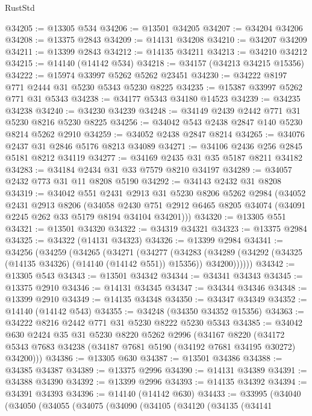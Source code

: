\begin{lexlean}{RustStd}
\begin{coremodule}
@34205 := @13305 @534
@34206 := @13501 @34205
@34207 := @34204 @34206
@34208 := @13375 @2843
@34209 := @14131 @34208
@34210 := @34207 @34209
@34211 := @13399 @2843
@34212 := @14135 @34211
@34213 := @34210 @34212
@34215 := @14140 (@14142 @534)
@34218 := @34157 (@34213 @34215 @15356)
@34222 := @15974 @33997 @5262 @5262 @23451
@34230 := @34222 @8197 @771 @2444 @31 @5230 @5343 @5230 @8225
@34235 := @15387 @33997 @5262 @771 @31 @5343
@34238 := @34177 @5343 @34180 @14523
@34239 := @34235 @34238
@34240 := @34230 @34239
@34248 := @34149 @2439 @2442 @771 @31 @5230 @8216 @5230 @8225
@34256 := @34042 @543 @2438 @2847 @140 @5230 @8214 @5262 @2910
@34259 := @34052 @2438 @2847 @8214
@34265 := @34076 @2437 @31 @2846 @5176 @8213 @34089
@34271 := @34106 @2436 @256 @2845 @5181 @8212 @34119
@34277 := @34169 @2435 @31 @35 @5187 @8211 @34182
@34283 := @34184 @2434 @31 @33 @7579 @8210 @34197
@34289 := @34057 @2432 @773 @31 @11 @8208 @5190
@34292 := @34143 @2432 @31 @8208
@34319 := @34042
    @551
    @2431
    @2913
    @31
    @5230
    @8206
    @5262
    @2984
    (@34052
      @2431
      @2913
      @8206
      (@34058
        @2430
        @751
        @2912
        @6465
        @8205
        @34074
        (@34091 @2245 @262 @33 @5179 @8194 @34104 @34201)))
@34320 := @13305 @551
@34321 := @13501 @34320
@34322 := @34319 @34321
@34323 := @13375 @2984
@34325 := @34322 (@14131 @34323)
@34326 := @13399 @2984
@34341 := @34256
    (@34259
      (@34265
        (@34271
          (@34277
            (@34283
              (@34289 (@34292 (@34325 (@14135 @34326) (@14140 (@14142 @551)) @15356)) @34200))))))
@34342 := @13305 @543
@34343 := @13501 @34342
@34344 := @34341 @34343
@34345 := @13375 @2910
@34346 := @14131 @34345
@34347 := @34344 @34346
@34348 := @13399 @2910
@34349 := @14135 @34348
@34350 := @34347 @34349
@34352 := @14140 (@14142 @543)
@34355 := @34248 (@34350 @34352 @15356)
@34363 := @34222 @8216 @2442 @771 @31 @5230 @8222 @5230 @5343
@34385 := @34042
    @630
    @2424
    @35
    @31
    @5230
    @8220
    @5262
    @2996
    (@34167
      @8220
      (@34172 @5343 @7683 @34238 (@34187 @7681 @5190 (@34192 @7681 @34195 @30272) @34200)))
@34386 := @13305 @630
@34387 := @13501 @34386
@34388 := @34385 @34387
@34389 := @13375 @2996
@34390 := @14131 @34389
@34391 := @34388 @34390
@34392 := @13399 @2996
@34393 := @14135 @34392
@34394 := @34391 @34393
@34396 := @14140 (@14142 @630)
@34433 := @33995
    (@34040
      (@34050
        (@34055
          (@34075
            (@34090
              (@34105
                (@34120
                  (@34135
                    (@34141

\end{coremodule}
\end{lexlean}
